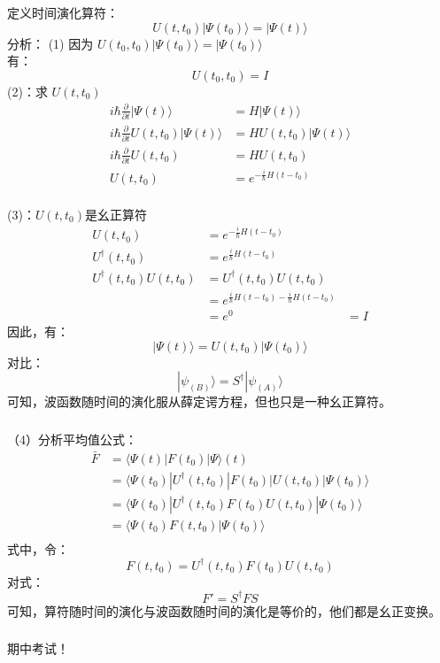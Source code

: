 \begin{frame}  
    \frametitle{}  
    定义时间演化算符：
    $$ U(t,t_0) |\Psi(t_0)\rangle = |\Psi(t)\rangle  $$
    \alert{分析}：
    (1) 因为 $ U(t_0,t_0) |\Psi(t_0)\rangle = |\Psi(t_0)\rangle  $ \\
     有：$$ U(t_0,t_0)=I $$
    (2)：求 $ U(t,t_0)$
    $$ \begin{aligned}
        i\hbar \frac{\partial }{\partial t} |\Psi(t)\rangle &= H|\Psi(t)\rangle  \\
        i\hbar \frac{\partial }{\partial t}  U(t,t_0) |\Psi(t)\rangle &= H U(t,t_0) |\Psi(t)\rangle  \\
        i\hbar \frac{\partial }{\partial t}  U(t,t_0)  &= H U(t,t_0)  \\
        U(t,t_0)  &= e^{-\frac{i}{\hbar} H(t-t_0)}  \\
    \end{aligned} $$
\end{frame} 

\begin{frame}  
    (3)：$ U(t,t_0)$是幺正算符
    $$ \begin{aligned}
        U(t,t_0)  &= e^{-\frac{i}{\hbar} H(t-t_0)}  \\
        U^\dagger (t,t_0)  &= e^{\frac{i}{\hbar} H(t-t_0)}  \\
        U^\dagger (t,t_0)U(t,t_0) &= U^\dagger (t,t_0)U(t,t_0) \\
         &=e^{\frac{i}{\hbar} H(t-t_0)-\frac{i}{\hbar} H(t-t_0)} \\
         &=e^0
         &=I
    \end{aligned} $$
    因此，有：
    $$ |\Psi(t)\rangle = U(t,t_0) |\Psi(t_0)\rangle   $$
    对比： 
    $$ |\psi_{(B)}\rangle = S^\dagger |\psi_{(A)}\rangle $$
    可知，波函数随时间的演化服从薛定谔方程，但也只是一种幺正算符。
\end{frame} 

\begin{frame}  
    \frametitle{} 
    （4）分析平均值公式：
    $$ \begin{aligned}
        \bar{F} &= \langle \Psi(t) |F(t_0) | \Psi \rangle(t)  \\
        &= \langle \Psi(t_0) |U^\dagger (t,t_0) |F(t_0) | U(t,t_0) |\Psi(t_0)\rangle   \\
        &= \langle \Psi(t_0) |U^\dagger (t,t_0) F(t_0) U(t,t_0) |\Psi(t_0)\rangle   \\
        &= \langle \Psi(t_0) F(t,t_0) |\Psi(t_0)\rangle   \\
    \end{aligned} $$
     式中，令： $$ F(t,t_0) =U^\dagger (t,t_0) F(t_0) U(t,t_0)$$
     对式：
     $$F'=S^\dagger F S $$
     可知，算符随时间的演化与波函数随时间的演化是等价的，他们都是幺正变换。
\end{frame} 

\begin{frame}
    \frametitle{}  
    \centering
    \LARGE \color{red} 期中考试！ \\
\end{frame}